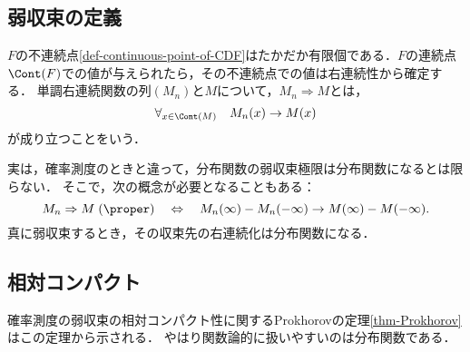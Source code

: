 \documentclass[uplatex,dvipdfmx]{jsreport}
\begin{document}
\subsection{弱収束の定義}

\begin{definition}
    $F$の不連続点\ref{def-continuous-point-of-CDF}はたかだか有限個である．$F$の連続点$\Cont(F)$での値が与えられたら，その不連続点での値は右連続性から確定する．
    単調右連続関数の列$(M_n)$と$M$について，$M_n\Rightarrow M$とは，
    \[\forall_{x\in\Cont(M)}\quad M_n(x)\to M(x)\]
    が成り立つことをいう．
\end{definition}
\begin{remark}[緊密性に対応する概念]
    実は，確率測度のときと違って，分布関数の弱収束極限は分布関数になるとは限らない．
    そこで，次の概念が必要となることもある：
    \[M_n\Rightarrow M\;(\proper)\quad\Leftrightarrow\quad M_n(\infty)-M_n(-\infty)\to M(\infty)-M(-\infty).\]
    真に弱収束するとき，その収束先の右連続化は分布関数になる．
\end{remark}

\subsection{相対コンパクト}

\begin{tcolorbox}[colframe=ForestGreen, colback=ForestGreen!10!white,breakable,colbacktitle=ForestGreen!40!white,coltitle=black,fonttitle=\bfseries\sffamily,
title=]
    確率測度の弱収束の相対コンパクト性に関するProkhorovの定理\ref{thm-Prokhorov}はこの定理から示される．
    やはり関数論的に扱いやすいのは分布関数である．
\end{tcolorbox}
\end{document}
